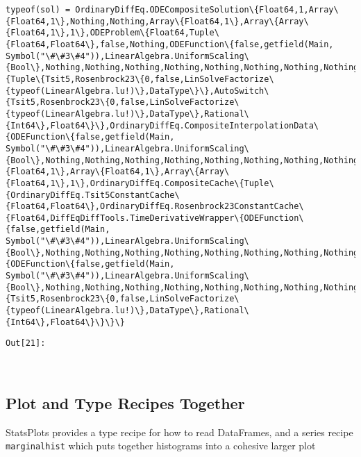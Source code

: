 \documentclass[11pt]{article}
\begin{document}
    \begin{Verbatim}[commandchars=\\\{\}]
typeof(sol) = OrdinaryDiffEq.ODECompositeSolution\{Float64,1,Array\{Float64,1\},Nothing,Nothing,Array\{Float64,1\},Array\{Array\{Float64,1\},1\},ODEProblem\{Float64,Tuple\{Float64,Float64\},false,Nothing,ODEFunction\{false,getfield(Main, Symbol("\#\#3\#4")),LinearAlgebra.UniformScaling\{Bool\},Nothing,Nothing,Nothing,Nothing,Nothing,Nothing,Nothing,Nothing\},Nothing,DiffEqBase.StandardODEProblem\},CompositeAlgorithm\{Tuple\{Tsit5,Rosenbrock23\{0,false,LinSolveFactorize\{typeof(LinearAlgebra.lu!)\},DataType\}\},AutoSwitch\{Tsit5,Rosenbrock23\{0,false,LinSolveFactorize\{typeof(LinearAlgebra.lu!)\},DataType\},Rational\{Int64\},Float64\}\},OrdinaryDiffEq.CompositeInterpolationData\{ODEFunction\{false,getfield(Main, Symbol("\#\#3\#4")),LinearAlgebra.UniformScaling\{Bool\},Nothing,Nothing,Nothing,Nothing,Nothing,Nothing,Nothing,Nothing\},Array\{Float64,1\},Array\{Float64,1\},Array\{Array\{Float64,1\},1\},OrdinaryDiffEq.CompositeCache\{Tuple\{OrdinaryDiffEq.Tsit5ConstantCache\{Float64,Float64\},OrdinaryDiffEq.Rosenbrock23ConstantCache\{Float64,DiffEqDiffTools.TimeDerivativeWrapper\{ODEFunction\{false,getfield(Main, Symbol("\#\#3\#4")),LinearAlgebra.UniformScaling\{Bool\},Nothing,Nothing,Nothing,Nothing,Nothing,Nothing,Nothing,Nothing\},Float64,Nothing\},DiffEqDiffTools.UDerivativeWrapper\{ODEFunction\{false,getfield(Main, Symbol("\#\#3\#4")),LinearAlgebra.UniformScaling\{Bool\},Nothing,Nothing,Nothing,Nothing,Nothing,Nothing,Nothing,Nothing\},Float64,Nothing\}\}\},AutoSwitch\{Tsit5,Rosenbrock23\{0,false,LinSolveFactorize\{typeof(LinearAlgebra.lu!)\},DataType\},Rational\{Int64\},Float64\}\}\}\}

    \end{Verbatim}
\texttt{\color{outcolor}Out[{\color{outcolor}21}]:}
    
    \begin{center}
    \end{center}
    { \hspace*{\fill} \\}
    

    \subsection{Plot and Type Recipes
Together}\label{plot-and-type-recipes-together}

StatsPlots provides a type recipe for how to read DataFrames, and a
series recipe \texttt{marginalhist} which puts together histograms into
a cohesive larger plot
\end{document}
